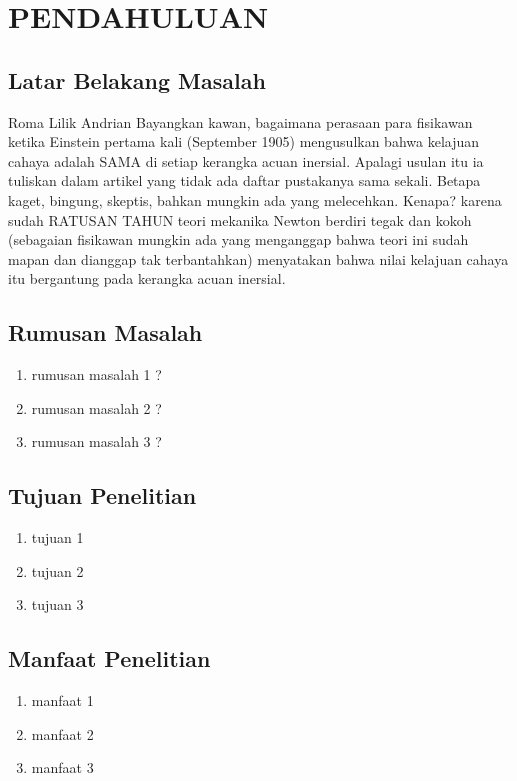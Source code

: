 \chapter{PENDAHULUAN}
\section{Latar Belakang Masalah}
Roma Lilik Andrian Bayangkan kawan, bagaimana perasaan para fisikawan ketika Einstein pertama kali (September 1905) mengusulkan bahwa kelajuan  cahaya adalah SAMA di setiap kerangka acuan inersial. Apalagi usulan itu ia tuliskan dalam artikel yang tidak ada daftar pustakanya sama sekali. Betapa kaget, bingung, skeptis, bahkan mungkin ada yang melecehkan. Kenapa? karena sudah RATUSAN TAHUN teori mekanika Newton berdiri tegak dan kokoh (sebagaian fisikawan mungkin ada yang menganggap bahwa teori ini sudah mapan dan dianggap tak terbantahkan) menyatakan bahwa nilai kelajuan cahaya itu bergantung pada kerangka acuan inersial. 

\section{Rumusan Masalah}
\begin{enumerate}
	\item rumusan masalah 1 ?
	\item rumusan masalah 2 ?
	\item rumusan masalah 3 ?
\end{enumerate}

\section{Tujuan Penelitian}
\begin{enumerate}
\item tujuan 1
\item tujuan 2
\item tujuan 3
\end{enumerate}

\section{Manfaat Penelitian}
\begin{enumerate}
\item manfaat 1
\item manfaat 2
\item manfaat 3
\end{enumerate}




